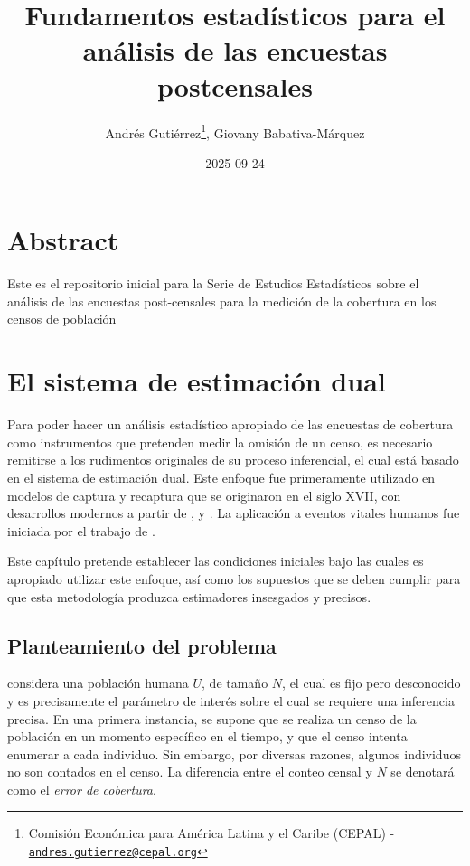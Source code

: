 \documentclass[
  12pt,
]{book}
\title{Fundamentos estadísticos para el análisis de las encuestas postcensales}
\author{Andrés Gutiérrez\footnote{Comisión Económica para América Latina y el Caribe (CEPAL) - \href{mailto:andres.gutierrez@cepal.org}{\nolinkurl{andres.gutierrez@cepal.org}}}, Giovany Babativa-Márquez}
\date{2025-09-24}
\begin{document}
\maketitle

{
\hypersetup{linkcolor=}
\setcounter{tocdepth}{0}
\tableofcontents
}
\listoffigures
\listoftables
\chapter*{Abstract}\label{abstract}

Este es el repositorio inicial para la Serie de Estudios Estadísticos sobre el análisis de las encuestas post-censales para la medición de la cobertura en los censos de población

\chapter{El sistema de estimación dual}\label{cap-dual}

Para poder hacer un análisis estadístico apropiado de las encuestas de cobertura como instrumentos que pretenden medir la omisión de un censo, es necesario remitirse a los rudimentos originales de su proceso inferencial, el cual está basado en el sistema de estimación dual. Este enfoque fue primeramente utilizado en modelos de captura y recaptura que se originaron en el siglo XVII, con desarrollos modernos a partir de \citet{petersen1896}, \citet{lincoln1930} y \citet{schnabel1938}. La aplicación a eventos vitales humanos fue iniciada por el trabajo de \citet{sekar1949}.

Este capítulo pretende establecer las condiciones iniciales bajo las cuales es apropiado utilizar este enfoque, así como los supuestos que se deben cumplir para que esta metodología produzca estimadores insesgados y precisos.

\section{Planteamiento del problema}\label{planteamiento-del-problema}

\citet{wolter1986coverage} considera una población humana \(U\), de tamaño \(N\), el cual es fijo pero desconocido y es precisamente el parámetro de interés sobre el cual se requiere una inferencia precisa. En una primera instancia, se supone que se realiza un censo de la población en un momento específico en el tiempo, y que el censo intenta enumerar a cada individuo. Sin embargo, por diversas razones, algunos individuos no son contados en el censo. La diferencia entre el conteo censal y \(N\) se denotará como el \emph{error de cobertura}.
\end{document}
